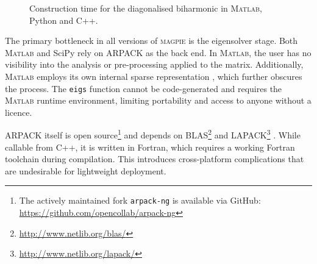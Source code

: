 \begin{figure}
    \centering
    \caption[Construction time for the diagonalised biharmonic]{Construction time for the diagonalised biharmonic in M\textsc{atlab}, Python and C\textsc{++}.}
    \label{fig:biharm-diag-comp}
\end{figure}

The primary bottleneck in all versions of \textsc{magpie} is the eigensolver stage. Both M\textsc{atlab} and SciPy rely on ARPACK \cite{lehoucq_arpack_1998} as the back end. In M\textsc{atlab}, the user has no visibility into the analysis or pre-processing applied to the matrix. Additionally, M\textsc{atlab} employs its own internal sparse representation \cite{gilbert_sparse_1992}, which further obscures the process. The \texttt{eigs} function cannot be code-generated and requires the M\textsc{atlab} runtime environment, limiting portability and access to anyone without a licence.

ARPACK itself is open source\footnote{The actively maintained fork \texttt{arpack-ng} is available via GitHub: \url{https://github.com/opencollab/arpack-ng}} and depends on BLAS\footnote{\url{http://www.netlib.org/blas/}} and LAPACK\footnote{\url{http://www.netlib.org/lapack/}} . While callable from C\textsc{++}, it is written in Fortran, which requires a working Fortran toolchain during compilation. This introduces cross-platform complications that are undesirable for lightweight deployment.



